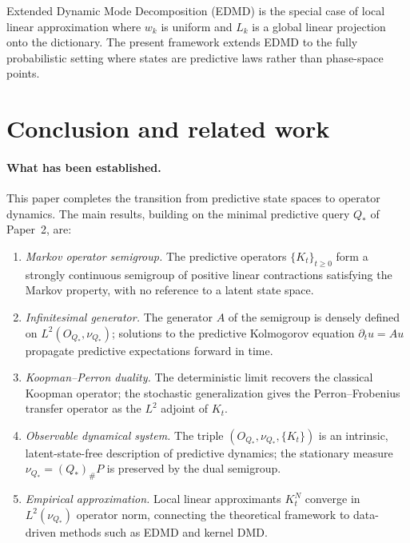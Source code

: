 \begin{remark}
Extended Dynamic Mode Decomposition (EDMD) is the special case of
local linear approximation where $w_k$ is uniform and $L_k$ is a
global linear projection onto the dictionary.  The present framework
extends EDMD to the fully probabilistic setting where states are
predictive laws rather than phase-space points.
\end{remark}

\section{Conclusion and related work}

\paragraph{What has been established.}
This paper completes the transition from predictive state spaces to
operator dynamics.  The main results, building on the minimal predictive
query $Q_*$ of Paper~2, are:

\begin{enumerate}
  \item \emph{Markov operator semigroup.}  The predictive operators
    $\{K_t\}_{t\ge0}$ form a strongly continuous semigroup of positive
    linear contractions satisfying the Markov property, with no reference
    to a latent state space.
  \item \emph{Infinitesimal generator.}  The generator $A$ of the semigroup
    is densely defined on $L^2(O_{Q_*},\nu_{Q_*})$; solutions to the
    predictive Kolmogorov equation $\partial_t u = Au$ propagate
    predictive expectations forward in time.
  \item \emph{Koopman--Perron duality.}  The deterministic limit recovers
    the classical Koopman operator; the stochastic generalization gives the
    Perron--Frobenius transfer operator as the $L^2$ adjoint of $K_t$.
  \item \emph{Observable dynamical system.}  The triple
    $(O_{Q_*},\nu_{Q_*},\{K_t\})$ is an intrinsic, latent-state-free
    description of predictive dynamics; the stationary measure
    $\nu_{Q_*} = (Q_*)_\#P$ is preserved by the dual semigroup.
  \item \emph{Empirical approximation.}  Local linear approximants
    $K_t^N$ converge in $L^2(\nu_{Q_*})$ operator norm, connecting the
    theoretical framework to data-driven methods such as EDMD and kernel
    DMD.
\end{enumerate}


